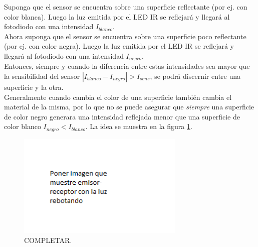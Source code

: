 \documentclass[10pt,conference,a4paper,onecolumn]{article}%
\begin{document}
Suponga que el sensor se encuentra sobre una superficie reflectante (por ej. con color blanca). Luego la luz emitida por el LED IR se reflejará y llegará al fotodiodo con una intensidad $I_{blanco}$.\\
Ahora suponga que el sensor se encuentra sobre una superficie poco reflectante (por ej. con color negra). Luego la luz emitida por el LED IR se reflejará y llegará al fotodiodo con una intensidad $I_{negro}$.\\
Entonces, siempre y cuando la diferencia entre estas intensidades sea mayor que la sensibilidad del sensor  $|I_{blanco} - I_{negro} |> I_{sens}$, se podrá discernir entre una superficie y la otra. \\
Generalmente cuando cambia el color de una superficie también cambia el material de la misma, por lo que no se puede asegurar que \textit{siempre} una superficie de color negro generara una intensidad reflejada menor que una superficie de color blanco $I_{negro} <I_{blanco}$. 
 La idea se muestra en la figura \ref{fig:sensorLinea}.
\begin{figure}[h]
\centering
\includegraphics[width=8cm]{./imagenes/sensorLinea.png}
\caption{COMPLETAR.}
\label{fig:sensorLinea}
\end{figure}
\end{document}
